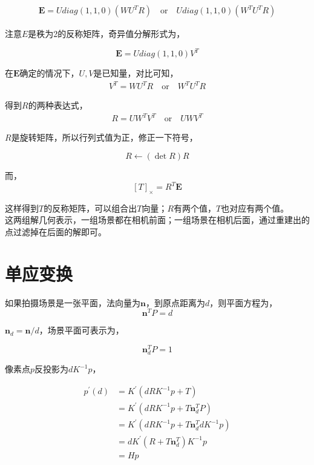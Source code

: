 	\begin{align*}
		\mathbf{E} = U diag(1,1,0)\left(WU^TR\right)\quad 
		\text{or} \quad 
		U diag(1,1,0)\left(W^TU^TR\right)
	\end{align*}

	注意$E$是秩为2的反称矩阵，奇异值分解形式为，

	$$
		\mathbf{E} = U diag(1,1,0) V^T
	$$

	在$\mathbf{E} $确定的情况下，$U,V$是已知量，对比可知，
	\begin{align*}
		V^T = WU^TR \quad \text{or}\quad W^TU^TR
	\end{align*}

	得到$R$的两种表达式，
	\begin{align*}
		R = UW^TV^T\quad \text{or}\quad UWV^T
	\end{align*}

	$R$是旋转矩阵，所以行列式值为正，修正一下符号，

	$$
		R \leftarrow (\mathop{det} R)R
	$$

	而，
	$$
		[T]_{\times} = R^T\mathbf{E}
	$$

	这样得到$T$的反称矩阵，可以组合出$T$向量；$R$有两个值，$T$也对应有两个值。\\


	这两组解几何表示，一组场景都在相机前面；一组场景在相机后面，通过重建出的点过滤掉在后面的解即可。

\section{单应变换}

	如果拍摄场景是一张平面，法向量为$\mathbf{n}$，到原点距离为$d$，则平面方程为，
	$$
		\mathbf{n}^T P = d
	$$

	$\mathbf{n}_d = \mathbf{n}/d$，场景平面可表示为，
	
	$$
		\mathbf{n}_d^T P = 1
	$$

	像素点$p$反投影为$dK^{-1}p$，

	\begin{align*}
		p^{\prime}(d) &= K^{\prime}\left(dRK^{-1}p + T\right)\\
		&= K^{\prime}\left(dRK^{-1}p + T\mathbf{n}_d^T P\right)\\
		&= K^{\prime}\left(dRK^{-1}p + T\mathbf{n}_d^TdK^{-1}p\right)\\
		&= dK^{\prime}\left(R + T\mathbf{n}_d^T\right)K^{-1}p\\
		&= Hp
	\end{align*}

